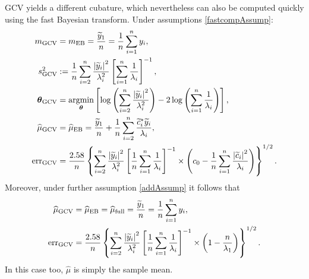 \documentclass{iitthesis}          %
\newcommand{\bm}[1]{\boldsymbol{#1}}
\newcommand{\vtheta}{{\bm{\theta}}}
\newcommand{\hmu}{\widehat{\mu}}
\newcommand{\MLE}{\textup{EB}}
\newcommand{\GCV}{\textup{GCV}}
\newcommand{\err}{\textup{err}}
\def\abs#1{\ensuremath{\left \lvert #1 \right \rvert}}
\providecommand{\argmin}{\operatorname*{argmin}}
\begin{document}
GCV yields a different cubature, which nevertheless can also be computed quickly using the fast Bayesian transform.  Under assumptions \eqref{fastcompAssump}:
\begin{align}
\nonumber
m_{\textup{GCV}} & = m_\MLE =  \frac{\widetilde{y}_1}{n} = \frac 1n \sum_{i=1}^n y_i,\\
\nonumber 
s^2_{\textup{GCV}} & : =  \frac 1{n} \sum_{i=2}^n \frac{\abs{\widetilde{y}_i}^2}{\lambda_i^2}  \left [ \sum_{i=1}^n \frac{1}{\lambda_i} \right]^{-1}, \\
\label{eqn:thetaGCV_fast}
\vtheta_{\GCV} 
&= \argmin_\vtheta \left[ \log \left ( \sum_{i=2}^n \frac{\abs{\widetilde{y}_i}^2}{\lambda_i^2} 
\right) -2\log\left( \sum_{i=1}^n \frac{1}{\lambda_i} \right)
\right], \\
\nonumber
\hmu_{\GCV}
&= \hmu_\MLE  = \frac{\widetilde{y}_1}{n} +
\frac 1n \sum_{i=2}^n \frac{ \widetilde{c}_i^* \widetilde{y}_i}{\lambda_i}, \\
\nonumber
\err_{\textup{GCV}} & =
\frac{2.58}{n}\left\{\sum_{i=2}^n \frac{\abs{\widetilde{y}_i}^2}{\lambda_i^2}  \left [ \frac 1n \sum_{i=1}^n \frac{1}{\lambda_i} \right]^{-1}  \times
\left( c_0 - \frac 1n \sum_{i=1}^n \frac{\abs{\widetilde{c}_i}^2}{\lambda_i} \right) 
\right\}^{1/2}.
\end{align}
Moreover, under further assumption \eqref{addAssump} it follows that 
\begin{align*}
\nonumber %
\hmu_{\textup{GCV}}
&= \hmu_\MLE = \hmu_{\textup{full}} =
\frac{\widetilde{y}_1}{n} = \frac 1n \sum_{i=1}^n y_i,\\
\err_{\textup{GCV}} & =
\frac{2.58}{n}\left\{\sum_{i=2}^n \frac{\abs{\widetilde{y}_i}^2}{\lambda_i^2}  \left [ \frac 1n \sum_{i=1}^n \frac{1}{\lambda_i} \right]^{-1}  \times
\left( 1 -  \frac{n}{\lambda_1} \right)  
\right\}^{1/2}.
\end{align*}
In this case too, $\hmu$ is simply the sample mean.
\end{document}

